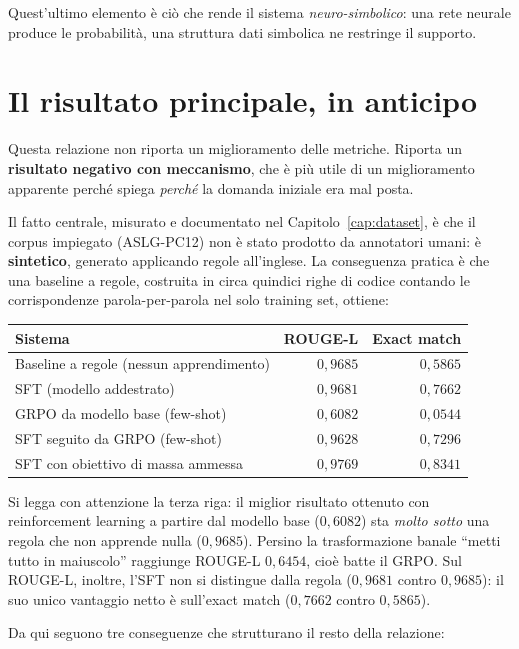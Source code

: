Quest'ultimo elemento è ciò che rende il sistema \emph{neuro-simbolico}: una rete
neurale produce le probabilità, una struttura dati simbolica ne restringe il
supporto.

\section{Il risultato principale, in anticipo}

Questa relazione non riporta un miglioramento delle metriche. Riporta un
\textbf{risultato negativo con meccanismo}, che è più utile di un miglioramento
apparente perché spiega \emph{perché} la domanda iniziale era mal posta.

Il fatto centrale, misurato e documentato nel
Capitolo~\ref{cap:dataset}, è che il corpus impiegato (ASLG-PC12) non è stato
prodotto da annotatori umani: è \textbf{sintetico}, generato applicando regole
all'inglese. La conseguenza pratica è che una baseline a regole, costruita in
circa quindici righe di codice contando le corrispondenze parola-per-parola nel
solo training set, ottiene:

\begin{center}
\begin{tabular}{lrr}
\toprule
Sistema & ROUGE-L & Exact match \\
\midrule
Baseline a regole (nessun apprendimento) & $0{,}9685$ & $0{,}5865$ \\
SFT (modello addestrato) & $0{,}9681$ & $0{,}7662$ \\
GRPO da modello base (few-shot) & $0{,}6082$ & $0{,}0544$ \\
SFT seguito da GRPO (few-shot) & $0{,}9628$ & $0{,}7296$ \\
SFT con obiettivo di massa ammessa & $0{,}9769$ & $0{,}8341$ \\
\bottomrule
\end{tabular}
\end{center}

Si legga con attenzione la terza riga: il miglior risultato ottenuto con
reinforcement learning a partire dal modello base ($0{,}6082$) sta \emph{molto
sotto} una regola che non apprende nulla ($0{,}9685$). Persino la trasformazione
banale ``metti tutto in maiuscolo'' raggiunge ROUGE-L $0{,}6454$, cioè batte il
GRPO. Sul ROUGE-L, inoltre, l'SFT non si distingue dalla regola ($0{,}9681$
contro $0{,}9685$): il suo unico vantaggio netto è sull'exact match
($0{,}7662$ contro $0{,}5865$).

Da qui seguono tre conseguenze che strutturano il resto della relazione:

